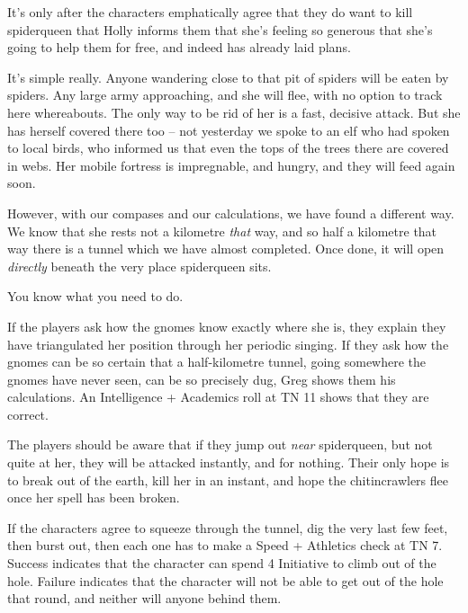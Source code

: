 \begin{multicols}{2}
\begin{speechtext}
\end{speechtext}

It's only after the characters emphatically agree that they do want to kill \gls{spiderqueen} that Holly informs them that she's feeling so generous that she's going to help them for free, and indeed has already laid plans.

\begin{speechtext}

	It's simple really.  Anyone wandering close to that pit of spiders will be eaten by spiders.  Any large army approaching, and she will flee, with no option to track here whereabouts.  The only way to be rid of her is a fast, decisive attack.  But she has herself covered there too -- not yesterday we spoke to an elf who had spoken to local birds, who informed us that even the tops of the trees there are covered in webs.  Her mobile fortress is impregnable, and hungry, and they will feed again soon.

	However, with our compases and our calculations, we have found a different way.  We know that she rests not a kilometre \emph{that} way, and so half a kilometre that way there is a tunnel which we have almost completed.  Once done, it will open \emph{directly} beneath the very place \gls{spiderqueen} sits.

	You know what you need to do.

\end{speechtext}

If the players ask how the gnomes know exactly where she is, they explain they have triangulated her position through her periodic singing.  If they ask how the gnomes can be so certain that a half-kilometre tunnel, going somewhere the gnomes have never seen, can be so precisely dug, Greg shows them his calculations.  An Intelligence + Academics roll at TN 11 shows that they are correct.

The players should be aware that if they jump out \emph{near} \gls{spiderqueen}, but not quite at her, they will be attacked instantly, and for nothing.  Their only hope is to break out of the earth, kill her in an instant, and hope the chitincrawlers flee once her spell has been broken.

If the characters agree to squeeze through the tunnel, dig the very last few feet, then burst out, then each one has to make a Speed + Athletics check at TN 7.  Success indicates that the character can spend 4 Initiative to climb out of the hole.  Failure indicates that the character will not be able to get out of the hole that round, and neither will anyone behind them.


\end{multicols}
